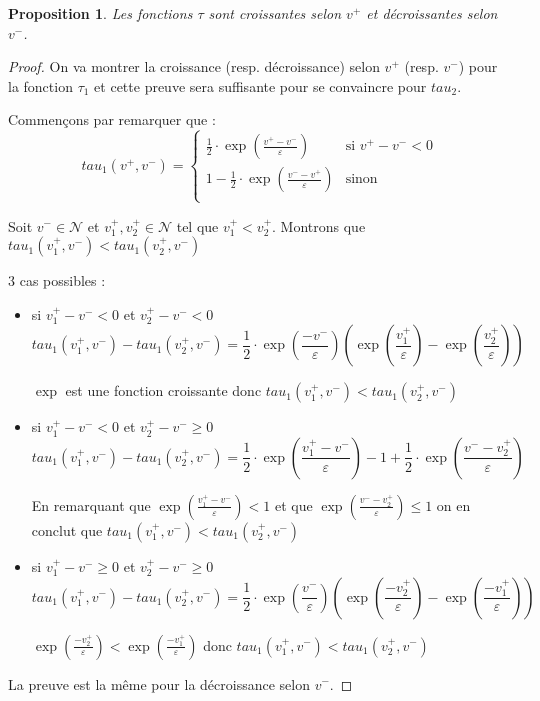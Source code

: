 \documentclass[12pt]{article}
\newtheorem{proposition}{Proposition}[section]
\theoremstyle{defi}
\theoremstyle{not}
\theoremstyle{prob}
\begin{document}
      \begin{proposition}
        Les fonctions $\tau$ sont croissantes selon $v^+$ et décroissantes selon $v^-$.
      \end{proposition}
      \begin{proof}
        On va montrer la croissance (resp. décroissance) selon $v^+$ (resp. $v^-$) pour la fonction $\tau_1$ et cette preuve sera suffisante pour se convaincre pour $tau_2$.

        Commençons par remarquer que :
        $$tau_1(v^+, v^-) = \left\{
          \begin{array}{ll}
            \frac{1}{2} \cdot \exp(\frac{v^+ - v^-}{\varepsilon})  & \mbox{si } v^+ - v^- < 0 \\
            1 - \frac{1}{2} \cdot \exp(\frac{v^- - v^+}{\varepsilon}) & \mbox{sinon} \\
          \end{array}
        \right.$$

        Soit $v^- \in \mathcal{N}$ et $v_1^+, v_2^+ \in \mathcal{N}$ tel que $v_1^+ < v_2^+$. Montrons que $tau_1(v_1^+, v^-) < tau_1(v_2^+, v^-)$

        3 cas possibles :
        \begin{itemize}
          \item si $v_1^+ - v^- < 0$ et $v_2^+ - v^- < 0$
          $$tau_1(v_1^+, v^-) - tau_1(v_2^+, v^-) = \frac{1}{2} \cdot \exp(\frac{- v^-}{\varepsilon})(\exp(\frac{v_1^+}{\varepsilon}) - \exp(\frac{v_2^+}{\varepsilon}))$$

          $\exp$ est une fonction croissante donc $tau_1(v_1^+, v^-) < tau_1(v_2^+, v^-)$

          \item si $v_1^+ - v^- < 0$ et $v_2^+ - v^- \geq 0$
          $$tau_1(v_1^+, v^-) - tau_1(v_2^+, v^-) = \frac{1}{2} \cdot \exp(\frac{v_1^+ - v^-}{\varepsilon}) - 1 + \frac{1}{2} \cdot \exp(\frac{v^- - v_2^+}{\varepsilon})$$

          En remarquant que $\exp(\frac{v_1^+ - v^-}{\varepsilon}) < 1$ et que $\exp(\frac{v^- - v_2^+}{\varepsilon}) \leq 1$ on en conclut que $tau_1(v_1^+, v^-) < tau_1(v_2^+, v^-)$

          \item si $v_1^+ - v^- \geq 0$ et $v_2^+ - v^- \geq 0$
          $$tau_1(v_1^+, v^-) - tau_1(v_2^+, v^-) = \frac{1}{2} \cdot \exp(\frac{v^-}{\varepsilon})(\exp(\frac{- v_2^+}{\varepsilon}) - \exp(\frac{- v_1^+}{\varepsilon}))$$

          $\exp(\frac{- v_2^+}{\varepsilon}) < \exp(\frac{- v_1^+}{\varepsilon})$ donc $tau_1(v_1^+, v^-) < tau_1(v_2^+, v^-)$
        \end{itemize}

        La preuve est la même pour la décroissance selon $v^-$.
      \end{proof}
\end{document}

